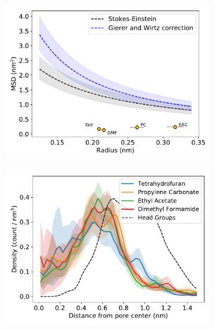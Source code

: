 \documentclass[journal=jpcbfk,manuscript=article]{achemso}
\begin{document}
  \begin{figure}[!htb]
  \centering
  \begin{subfigure}{0.325\textwidth}
  \includegraphics[width=\textwidth]{msd_radius_nondonors_10wt.pdf}
  \caption{}\label{fig:nondonors_msd}
  \end{subfigure}
  \begin{subfigure}{0.325\textwidth}
  \includegraphics[width=\textwidth]{nondonors_rdf.pdf}
  \caption{}\label{fig:nondonors_rdf}
  \end{subfigure}
  \begin{subfigure}{0.325\textwidth}

\end{subfigure}
\end{figure}
\end{document}
